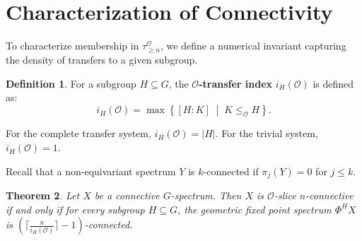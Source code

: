 \documentclass[11pt]{article}
\theoremstyle{plain}
\newtheorem{theorem}{Theorem}[section]
\theoremstyle{definition}
\newtheorem{definition}[theorem]{Definition}
\newcommand{\Ocal}{\mathcal{O}}
\newcommand{\ceil}[1]{\lceil #1 \rceil}
\begin{document}
\section{Characterization of Connectivity}

To characterize membership in $\tau_{\ge n}^\Ocal$, we define a numerical invariant capturing the density of transfers to a given subgroup.

\begin{definition}
    For a subgroup $H \subseteq G$, the \textbf{$\Ocal$-transfer index} $i_H(\Ocal)$ is defined as:
    \[
    i_H(\Ocal) = \max \left\{ [H:K] \;\middle|\; K \le_{\Ocal} H \right\}.
    \]
\end{definition}
For the complete transfer system, $i_H(\Ocal) = |H|$. For the trivial system, $i_H(\Ocal) = 1$.

Recall that a non-equivariant spectrum $Y$ is $k$-connected if $\pi_j(Y) = 0$ for $j \le k$.

\begin{theorem}
    Let $X$ be a connective $G$-spectrum. Then $X$ is $\Ocal$-slice $n$-connective if and only if for every subgroup $H \subseteq G$, the geometric fixed point spectrum $\Phi^H X$ is $(\ceil{\frac{n}{i_H(\Ocal)}} - 1)$-connected.
\end{theorem}
\end{document}

